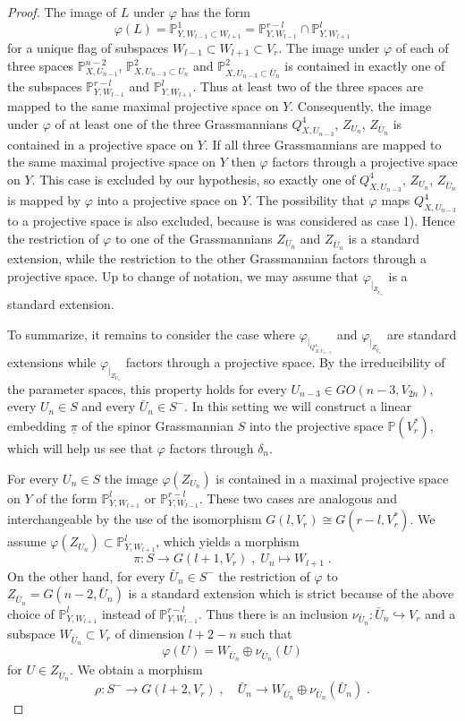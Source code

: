 \documentclass[12pt]{amsart}
\def\PP {{\mathbb P}}     %
\def\hw  {\hookrightarrow}
\def\ul  {\underline}
\begin{document}
\begin{proof}
The image of $L$ under $\varphi$ has the form 
$$
\varphi(L)=\PP^1_{Y,W_{l-1}\subset W_{l+1}} = \PP^{r-l}_{Y, W_{l-1}} \cap \PP^l_{Y,W_{l+1}}
$$
for a unique flag of subspaces $W_{l-1}\subset W_{l+1}\subset V_r$. The image under $\varphi$ of each of three spaces $\PP^{n-2}_{X, U_{n-1}}$, $\PP^2_{X,U_{n-3}\subset U_n}$ and $\PP^2_{X,U_{n-3}\subset \bar U_n}$ is contained in exactly one of the subspaces $\PP^{r-l}_{Y,W_{l-1}}$ and $\PP^{l}_{Y,W_{l+1}}$. Thus at least two of the three spaces are mapped to the same maximal projective space on $Y$. Consequently, the image under $\varphi$ of at least one of the three Grassmannians $Q^4_{X,U_{n-3}}$, $Z_{U_n}$, $Z_{\bar U_n}$ is contained in a projective space on $Y$. If all three Grassmannians are mapped to the same maximal projective space on $Y$ then $\varphi$ factors through a projective space on $Y$. This case is excluded by our hypothesis, so exactly one of $Q^4_{X,U_{n-3}}$, $Z_{U_n}$, $Z_{\bar U_n}$ is mapped by $\varphi$ into a projective space on $Y$. The possibility that $\varphi$ maps $Q^4_{X,U_{n-3}}$ to a projective space is also excluded, because is was considered as case 1). Hence the restriction of $\varphi$ to one of the Grassmannians $Z_{U_n}$ and $Z_{\bar U_n}$ is a standard extension, while the restriction to the other Grassmannian factors through a projective space. Up to change of notation, we may assume that $\varphi_{\vert_{Z_{\bar U_n}}}$ is a standard extension.

To summarize, it remains to consider the case where $\varphi_{\vert_{Q^4_{X,U_{n-3}}}}$ and $\varphi_{\vert_{Z_{\bar U_n}}}$ are standard extensions while $\varphi_{\vert_{Z_{U_n}}}$ factors through a projective space. By the irreducibility of the parameter spaces, this property holds for every $U_{n-3}\in GO(n-3,V_{2n})$, every $U_{n}\in S$ and every $\bar U_n\in S^-$. In this setting we will construct a linear embedding $\ul{\pi}$ of the spinor Grassmannian $S$ into the projective space $\PP(V_r^*)$, which will help us see that $\varphi$ factors through $\delta_n$.

For every $U_n\in S$ the image $\varphi(Z_{U_n})$ is contained in a maximal projective space on $Y$ of the form $\PP^l_{Y,W_{l+1}}$ or $\PP^{r-l}_{Y,W_{l-1}}$. These two cases are analogous and interchangeable by the use of the isomorphism $G(l,V_r)\cong G(r-l,V_r^*)$. We assume $\varphi(Z_{U_n})\subset \PP^l_{Y,W_{l+1}}$, which yields a morphism
$$
\pi:S\to G(l+1,V_r)\;,\; U_n\mapsto W_{l+1} \;.
$$
On the other hand, for every $\bar U_n\in S^-$ the restriction of $\varphi$ to $Z_{\bar U_n}= G(n-2,\bar U_n)$ is a standard extension which is strict because of the above choice of $\PP^l_{Y,W_{l+1}}$ instead of $\PP^{r-l}_{Y,W_{l-1}}$. Thus there is an inclusion $\nu_{\bar U_n}:\bar U_n\hw V_r$ and a subspace $W_{\bar U_n}\subset V_r$ of dimension $l+2-n$ such that
$$
\varphi(U)=W_{\bar U_n}\oplus \nu_{\bar U_n}(U)
$$
for $U\in Z_{\bar U_n}$. We obtain a morphism
$$
\rho : S^- \to G(l+2,V_r)\;,\quad \bar U_n\to W_{\bar U_n}\oplus \nu_{\bar U_n}(\bar U_n) \;.
$$


\end{proof}
\end{document}
